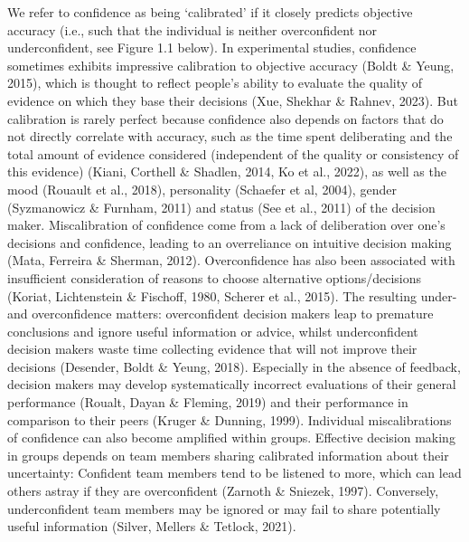 \documentclass[a4paper, nobind]{templates/ociamthesis}
\begin{document}
\hfill\break
We refer to confidence as being `calibrated' if it closely predicts objective accuracy (i.e., such that the individual is neither overconfident nor underconfident, see Figure 1.1 below). In experimental studies, confidence sometimes exhibits impressive calibration to objective accuracy (Boldt \& Yeung, 2015), which is thought to reflect people's ability to evaluate the quality of evidence on which they base their decisions (Xue, Shekhar \& Rahnev, 2023). But calibration is rarely perfect because confidence also depends on factors that do not directly correlate with accuracy, such as the time spent deliberating and the total amount of evidence considered (independent of the quality or consistency of this evidence) (Kiani, Corthell \& Shadlen, 2014, Ko et al., 2022), as well as the mood (Rouault et al., 2018), personality (Schaefer et al, 2004), gender (Syzmanowicz \& Furnham, 2011) and status (See et al., 2011) of the decision maker. Miscalibration of confidence come from a lack of deliberation over one's decisions and confidence, leading to an overreliance on intuitive decision making (Mata, Ferreira \& Sherman, 2012). Overconfidence has also been associated with insufficient consideration of reasons to choose alternative options/decisions (Koriat, Lichtenstein \& Fischoff, 1980, Scherer et al., 2015). The resulting under- and overconfidence matters: overconfident decision makers leap to premature conclusions and ignore useful information or advice, whilst underconfident decision makers waste time collecting evidence that will not improve their decisions (Desender, Boldt \& Yeung, 2018). Especially in the absence of feedback, decision makers may develop systematically incorrect evaluations of their general performance (Roualt, Dayan \& Fleming, 2019) and their performance in comparison to their peers (Kruger \& Dunning, 1999). Individual miscalibrations of confidence can also become amplified within groups. Effective decision making in groups depends on team members sharing calibrated information about their uncertainty: Confident team members tend to be listened to more, which can lead others astray if they are overconfident (Zarnoth \& Sniezek, 1997). Conversely, underconfident team members may be ignored or may fail to share potentially useful information (Silver, Mellers \& Tetlock, 2021).

\newpage
\end{document}
